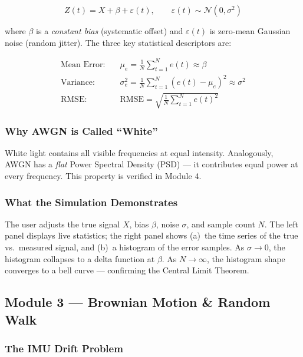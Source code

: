 \documentclass[12pt, a4paper]{article}
\begin{document}
\begin{equation}
  Z(t) = X + \beta + \varepsilon(t), \qquad \varepsilon(t) \sim \mathcal{N}(0, \sigma^2)
  \label{eq:awgn}
\end{equation}

where $\beta$ is a \emph{constant bias} (systematic offset) and $\varepsilon(t)$ is
zero-mean Gaussian noise (random jitter). The three key statistical descriptors are:

\begin{align}
  \text{Mean Error:} \quad & \mu_e = \frac{1}{N}\sum_{t=1}^{N} e(t) \approx \beta \\
  \text{Variance:}   \quad & \sigma_e^2 = \frac{1}{N}\sum_{t=1}^{N}(e(t) - \mu_e)^2 \approx \sigma^2 \\
  \text{RMSE:}       \quad & \text{RMSE} = \sqrt{\frac{1}{N}\sum_{t=1}^{N} e(t)^2}
\end{align}

\subsubsection{Why AWGN is Called ``White''}

White light contains all visible frequencies at equal intensity. Analogously, AWGN has
a \emph{flat} Power Spectral Density (PSD) --- it contributes equal power at every
frequency. This property is verified in Module 4.

\subsubsection{What the Simulation Demonstrates}

The user adjusts the true signal $X$, bias $\beta$, noise $\sigma$, and sample count
$N$. The left panel displays live statistics; the right panel shows (a)~the time series
of the true vs.\ measured signal, and (b)~a histogram of the error samples. As
$\sigma \to 0$, the histogram collapses to a delta function at $\beta$. As
$N \to \infty$, the histogram shape converges to a bell curve --- confirming the
Central Limit Theorem.

\subsection{Module 3 --- Brownian Motion \& Random Walk}

\subsubsection{The IMU Drift Problem}
\end{document}
